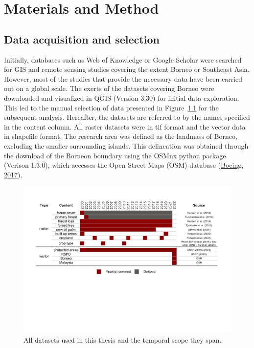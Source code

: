 \documentclass[
  letterpaper,
  DIV=11,
  numbers=noendperiod]{scrreprt}
\begin{document}
\hypertarget{sec-method}{%
\chapter{Materials and Method}\label{sec-method}}

\hypertarget{data-acquisition-and-selection}{%
\section{Data acquisition and
selection}\label{data-acquisition-and-selection}}

Initially, databases such as Web of Knowledge or Google Scholar were
searched for GIS and remote sensing studies covering the extent Borneo
or Southeast Asia. However, most of the studies that provide the
necessary data have been carried out on a global scale. The exerts of
the datasets covering Borneo were downloaded and visualized in QGIS
(Version 3.30) for initial data exploration. This led to the manual
selection of data presented in Figure~\ref{fig-data_overview} for the
subsequent analysis. Hereafter, the datasets are referred to by the
names specified in the content column. All raster datasets were in tif
format and the vector data in shapefile format. The research area was
defined as the landmass of Borneo, excluding the smaller surrounding
islands. This delineation was obtained through the download of the
Borneon boundary using the OSMnx python package (Verison 1.3.0), which
accesses the Open Street Maps (OSM) database
(\protect\hyperlink{ref-boeingOSMnxPythonPackage2017}{Boeing, 2017}).

\begin{figure}

{\centering \includegraphics{text/05_method_files/data_overview.pdf}

}

\caption{\label{fig-data_overview}All datasets used in this thesis and
the temporal scope they span.}

\end{figure}
\end{document}
